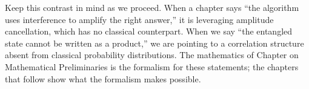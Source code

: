 Keep this contrast in mind as we proceed. When a chapter says ``the algorithm uses interference to amplify the right answer,'' it is leveraging amplitude cancellation, which has no classical counterpart. When we say ``the entangled state cannot be written as a product,'' we are pointing to a correlation structure absent from classical probability distributions. The mathematics of Chapter on Mathematical Preliminaries is the formalism for these statements; the chapters that follow show what the formalism makes possible.

\textsep
